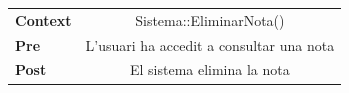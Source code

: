 \begin{itemize}
\begin{table}[!h]
\centering
\begin{tabular}{l C}
\textbf{Context}  & Sistema::EliminarNota()\\
\textbf{Pre} & L'usuari ha accedit a consultar una nota\\
\textbf{Post} & El sistema elimina la nota\\
\end{tabular}
\label{}
\end{table}

\end{itemize}
